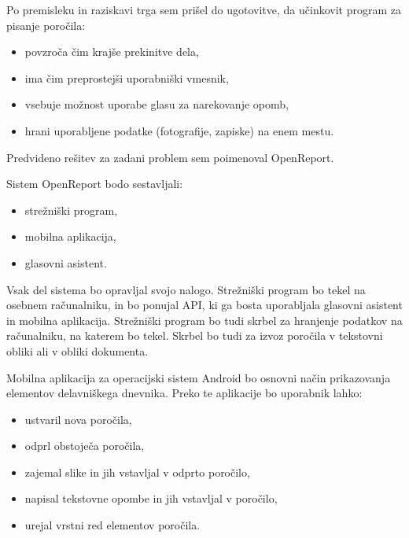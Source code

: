 \documentclass[a4paper, 12pt]{book}
\begin{document}
Po premisleku in raziskavi trga sem prišel do ugotovitve, da učinkovit program za pisanje poročila:
\begin{itemize}
	\item povzroča čim krajše prekinitve dela,
	\item ima čim preprostejši uporabniški vmesnik,
	\item vsebuje možnost uporabe glasu za narekovanje opomb,
	\item hrani uporabljene podatke (fotografije, zapiske) na enem mestu.
\end{itemize}

Predvideno rešitev za zadani problem sem poimenoval OpenReport.

Sistem OpenReport bodo sestavljali:
\begin{itemize}
	\item strežniški program, 
	\item mobilna aplikacija,
	\item glasovni asistent.
\end{itemize}

Vsak del sistema bo opravljal svojo nalogo.
Strežniški program bo tekel na osebnem računalniku, in bo ponujal API, ki ga bosta uporabljala glasovni asistent in mobilna aplikacija.
Strežniški program bo tudi skrbel za hranjenje podatkov na računalniku, na katerem bo tekel.
Skrbel bo tudi za izvoz poročila v tekstovni obliki ali v obliki dokumenta.

Mobilna aplikacija za operacijski sistem Android bo osnovni način prikazovanja elementov delavniškega dnevnika.
Preko te aplikacije bo uporabnik lahko:
\begin{itemize}
	\item ustvaril nova poročila,
	\item odprl obstoječa poročila,
	\item zajemal slike in jih vstavljal v odprto poročilo,
	\item napisal tekstovne opombe in jih vstavljal v poročilo,
	\item urejal vrstni red elementov poročila.
\end{itemize}
\end{document}
